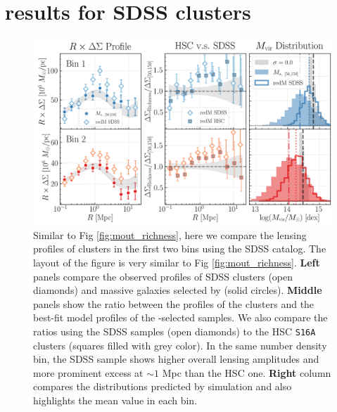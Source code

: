 \documentclass[fleqn,usenatbib,useAMS,english]{mnras}
\begin{document}
\section{\topn{} results for SDSS \redm{} clusters}
	\label{app:sdss_redm}


  \begin{figure}
      \centering
      \includegraphics[width=\textwidth]{figure/topn_fig_appendix_3}
      \caption{
          Similar to Fig \ref{fig:mout_richness}, here we compare the lensing profiles of
          \redm{} clusters in the first two \topn{} bins using the SDSS \redm{} catalog.
          The layout of the figure is very similar to Fig \ref{fig:mout_richness}.
          \textbf{Left} panels compare the observed \rdsigma{} profiles of SDSS \redm{} clusters
          (open diamonds) and massive galaxies selected by  (solid circles).
          \textbf{Middle} panels show the ratio between the \dsigma{} profiles of the \redm{} clusters
          and the best-fit model profiles of the -selected samples.
          We also compare the ratios using the SDSS \redm{} samples (open diamonds) to the
          HSC \texttt{S16A} \redm{} clusters (squares filled with grey color).
          In the same number density bin, the SDSS \redm{} sample shows higher overall lensing
          amplitudes and more prominent excess at $\sim 1$ Mpc than the HSC one.
          \textbf{Right} column compares the \mvir{} distributions predicted by  simulation
          and also highlights the mean \mvir{} value in each bin.
      }
      \label{fig:sdss_redm}
  \end{figure}

\bsp
\label{lastpage}
\end{document}
